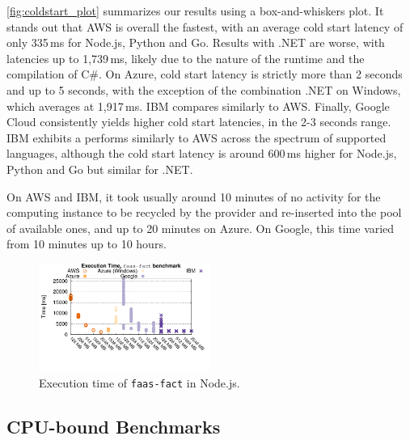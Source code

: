 \autoref{fig:coldstart_plot} summarizes our results using a box-and-whiskers plot.
It stands out that \gls{AWS} is overall the fastest, with an average cold start latency of only 335\,ms for Node.js, Python and Go. 
Results with .NET are worse, with latencies up to 1,739\,ms, likely due to the nature of the runtime and the compilation of C\#. 
On Azure, cold start latency is strictly more than 2 seconds and up to 5 seconds, with the exception of the combination .NET on Windows, which averages at 1,917\,ms. 
IBM compares similarly to \gls{AWS}.
Finally, Google Cloud consistently yields higher cold start latencies, in the 2-3 seconds range. 
\gls{IBM} exhibits a performs similarly to \gls{AWS} across the spectrum of supported languages, although the cold start latency is around 600\,ms higher for Node.js, Python and Go but similar for .NET.

On \gls{AWS} and \gls{IBM}, it took usually around 10 minutes of no activity for the computing instance to be recycled by the provider and re-inserted into the pool of available ones, and up to 20 minutes on Azure.
On Google, this time varied from 10 minutes up to 10 hours. %

\begin{figure}[!t]
\centering
\includegraphics[width=0.5\textwidth, trim={0 40 0 0}]{bilder/general_node/cpufact.pdf}
\caption{Execution time of \texttt{faas-fact} in Node.js.}
\label{fig:general_node_plot}
\end{figure}

\subsection{CPU-bound Benchmarks}
\label{sec:general_test}

